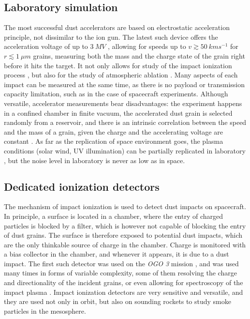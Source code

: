 \subsection{Laboratory simulation}

The most successful dust accelerators are based on electrostatic acceleration principle, not dissimilar to the ion gun. The latest such device offers the acceleration voltage of up to $\SI{3}{MV}$ \citep{shu20123}, allowing for speeds up to $v\gtrsim \SI{50}{kms^{-1}}$ for $r\lesssim\SI{1}{\mu m}$ grains, measuring both the mass and the charge state of the grain right before it hits the target. It not only allows for study of the impact ionization process \citep{shen2021electrostatic,shen2021laboratory,shen2023variability,nouzak2018laboratory,nouzak2021detection,kovcivsvcak2020effective,collette2014micrometeoroid}, but also for the study of atmospheric ablation \citep{thomas2017experimental,deluca2018ionization,deluca2022differential,tarnecki2023experimentally}. Many aspects of each impact can be measured at the same time, as there is no payload or transmission capacity limitation, such as in the case of spacecraft experiments. Although versatile, accelerator measurements bear disadvantages: the experiment happens in a confined chamber in finite vacuum, the accelerated dust grain is selected randomly from a reservoir, and there is an intrinsic correlation between the speed and the mass of a grain, given the charge and the accelerating voltage are constant \citep{shelton1960electrostatic}. As far as the replication of space environment goes, the plasma conditions (solar wind, UV illumination) can be partially replicated in laboratory \citep{shu20123,horanyi2008surface}, but the noise level in laboratory is never as low as in space. 

\subsection{Dedicated ionization detectors}

The mechanism of impact ionization is used to detect dust impacts on spacecraft. In principle, a surface is located in a chamber, where the entry of charged particles is blocked by a filter, which is however not capable of blocking the entry of dust grains.  The surface is therefore exposed to potential dust impacts, which are the only thinkable source of charge in the chamber. Charge is monitored with a bias collector in the chamber, and whenever it appears, it is due to a dust impact. The first such detector was used on the \textit{OGO 3} mission \citep{alexander1968zodiacal}, and was used many times in forms of variable complexity, some of them resolving the charge and directionality \citep{grun1992galileo,grun1992ulysses,berg1969pioneer} of the incident grains, or even allowing for spectroscopy of the impact plasma \citep{srama2004cassini,sommer2023measuring}. Impact ionization detectors are very sensitive and versatile, and they are used not only in orbit, but also on sounding rockets \citep{gunnarsdottir2019charging,trollvik2019observation} to study smoke particles in the mesosphere. 

